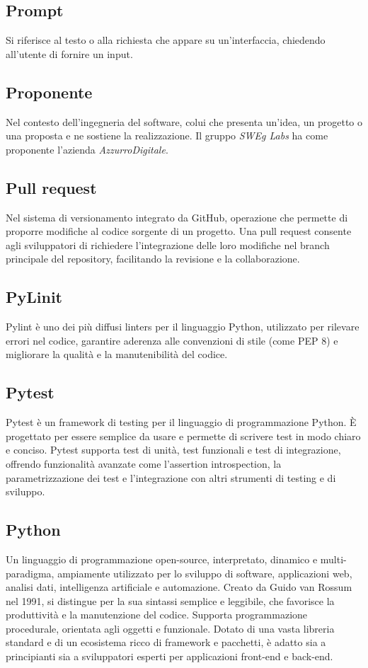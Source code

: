 \hypertarget{sec:Prompt}{}
\subsection*{Prompt}
Si riferisce al testo o alla richiesta che appare su un'interfaccia, chiedendo all'utente di fornire un input. 

\hypertarget{sec:proponente}{}
\subsection*{Proponente}
Nel contesto dell’ingegneria del software, colui che presenta un’idea, un progetto o una proposta e ne sostiene la realizzazione. Il gruppo \emph{SWEg Labs} 
ha come proponente l’azienda \emph{AzzurroDigitale}.

\hypertarget{sec:pull_request}{}
\subsection*{Pull request}
Nel sistema di versionamento integrato da GitHub, operazione che permette di proporre modifiche al codice sorgente di un progetto. 
Una pull request consente agli sviluppatori di richiedere l’integrazione delle loro modifiche nel branch principale del repository, 
facilitando la revisione e la collaborazione.

\hypertarget{sec:pylint}{}
\subsection*{PyLinit}
Pylint è uno dei più diffusi linters per il linguaggio Python, utilizzato per rilevare errori nel codice, garantire aderenza 
alle convenzioni di stile (come PEP 8) e migliorare la qualità e la manutenibilità del codice.

\hypertarget{sec:pytest}{}
\subsection*{Pytest}
Pytest è un framework di testing per il linguaggio di programmazione Python. È progettato per essere semplice da usare e
permette di scrivere test in modo chiaro e conciso. Pytest supporta test di unità, test funzionali e test di integrazione,
offrendo funzionalità avanzate come l'assertion introspection, la parametrizzazione dei test e l'integrazione con altri
strumenti di testing e di sviluppo.

\hypertarget{sec:python}{}
\subsection*{Python}
Un linguaggio di programmazione open-source, interpretato, dinamico e multi-paradigma, ampiamente utilizzato per lo sviluppo di software, applicazioni web, 
analisi dati, intelligenza artificiale e automazione. Creato da Guido van Rossum nel 1991, si distingue per la sua sintassi semplice e leggibile, che 
favorisce la produttività e la manutenzione del codice. Supporta programmazione procedurale, orientata agli oggetti e funzionale. Dotato di una vasta 
libreria standard e di un ecosistema ricco di framework e pacchetti, è adatto sia a principianti sia a sviluppatori esperti per applicazioni front-end e 
back-end.


